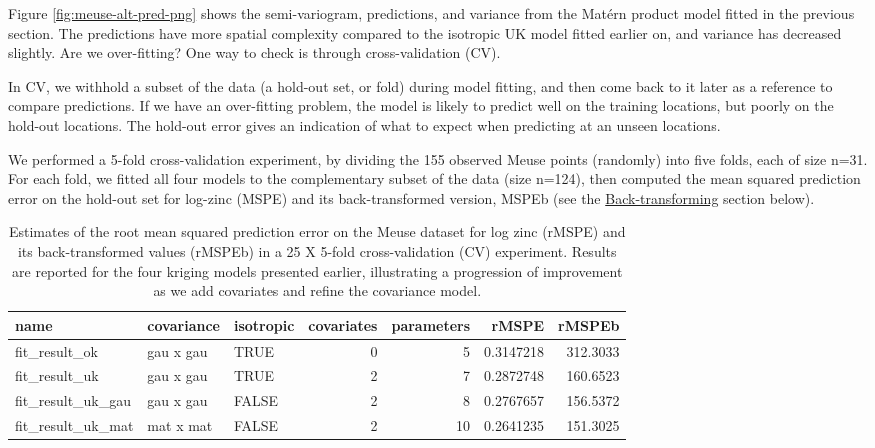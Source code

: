 Figure \ref{fig:meuse-alt-pred-png} shows the semi-variogram, predictions, and variance from the Matérn product model fitted in the previous section. The predictions have more spatial complexity compared to the isotropic UK model fitted earlier on, and variance has decreased slightly. Are we over-fitting? One way to check is through cross-validation (CV).

In CV, we withhold a subset of the data (a hold-out set, or fold) during model fitting, and then come back to it later as a reference to compare predictions. If we have an over-fitting problem, the model is likely to predict well on the training locations, but poorly on the hold-out locations. The hold-out error gives an indication of what to expect when predicting at an unseen locations.

We performed a 5-fold cross-validation experiment, by dividing the 155 observed Meuse points (randomly) into five folds, each of size n=31. For each fold, we fitted all four models to the complementary subset of the data (size n=124), then computed the mean squared prediction error on the hold-out set for log-zinc (MSPE) and its back-transformed version, MSPEb (see the \protect\hyperlink{back-transforming}{Back-transforming} section below).

\begin{table}

\caption{\label{tab:cv-table-latex}Estimates of the root mean squared prediction error on the Meuse dataset for log zinc (rMSPE) and its back-transformed values (rMSPEb) in a 25 X 5-fold cross-validation (CV) experiment. Results are reported for the four kriging models presented earlier, illustrating a progression of improvement as we add covariates and refine the covariance model.}
\centering
\fontsize{9}{11}\selectfont
\begin{tabular}[t]{lllrrrr}
\toprule
name & covariance & isotropic & covariates & parameters & rMSPE & rMSPEb\\
\midrule
fit\_result\_ok & gau x gau & TRUE & 0 & 5 & 0.3147218 & 312.3033\\
fit\_result\_uk & gau x gau & TRUE & 2 & 7 & 0.2872748 & 160.6523\\
fit\_result\_uk\_gau & gau x gau & FALSE & 2 & 8 & 0.2767657 & 156.5372\\
fit\_result\_uk\_mat & mat x mat & FALSE & 2 & 10 & 0.2641235 & 151.3025\\
\bottomrule
\end{tabular}
\end{table}

